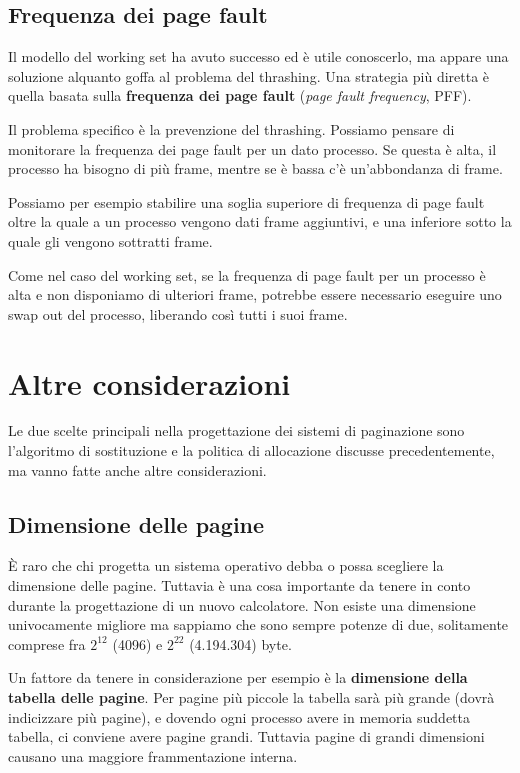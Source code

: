     \subsection{Frequenza dei page fault}
        Il modello del working set ha avuto successo ed è utile conoscerlo, ma appare una soluzione alquanto goffa al problema del thrashing. Una strategia più diretta è quella basata sulla \textbf{frequenza dei page fault} (\textit{page fault frequency}, PFF).
        
        Il problema specifico è la prevenzione del thrashing. Possiamo pensare di monitorare la frequenza dei page fault per un dato processo. Se questa è alta, il processo ha bisogno di più frame, mentre se è bassa c'è un'abbondanza di frame.
        
        Possiamo per esempio stabilire una soglia superiore di frequenza di page fault oltre la quale a un processo vengono dati frame aggiuntivi, e una inferiore sotto la quale gli vengono sottratti frame.
        
        Come nel caso del working set, se la frequenza di page fault per un processo è alta e non disponiamo di ulteriori frame, potrebbe essere necessario eseguire uno swap out del processo, liberando così tutti i suoi frame.
        
\section{Altre considerazioni}
    Le due scelte principali nella progettazione dei sistemi di paginazione sono l'algoritmo di sostituzione e la politica di allocazione discusse precedentemente, ma vanno fatte anche altre considerazioni.
    
    \subsection{Dimensione delle pagine}
        È raro che chi progetta un sistema operativo debba o possa scegliere la dimensione delle pagine. Tuttavia è una cosa importante da tenere in conto durante la progettazione di un nuovo calcolatore. Non esiste una dimensione univocamente migliore ma sappiamo che sono sempre potenze di due, solitamente comprese fra $2^{12}$ (4096) e $2^{22}$ (4.194.304) byte.
        
        Un fattore da tenere in considerazione per esempio è la \textbf{dimensione della tabella delle pagine}. Per pagine più piccole la tabella sarà più grande (dovrà indicizzare più pagine), e dovendo ogni processo avere in memoria suddetta tabella, ci conviene avere pagine grandi. Tuttavia pagine di grandi dimensioni causano una maggiore frammentazione interna.
        
